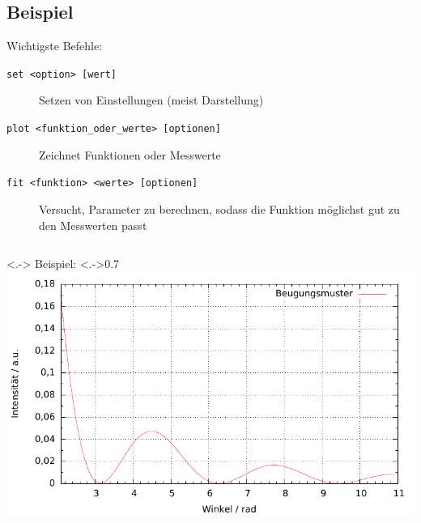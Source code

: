 \subsection{Beispiel}

\begin{frame}[<+->]
	Wichtigste Befehle:
	\begin{description}
		\item[\texttt{set <option> [wert]}] Setzen von Einstellungen (meist Darstellung)
		\item[\texttt{plot <funktion\_oder\_werte> [optionen]}] Zeichnet Funktionen oder Messwerte
		\item[\texttt{fit <funktion> <werte> [optionen]}] Versucht, Parameter zu berechnen, sodass die Funktion möglichst gut zu den Messwerten passt
	\end{description}

	\begin{columns}<.->
		Beispiel:
		\column<.->{0.7\textwidth}
		\includegraphics[width=\textwidth]{res/beispiel.pdf}
	\end{columns}
\end{frame}

